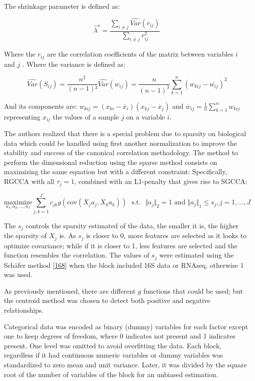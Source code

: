 \documentclass[
  12pt,
  a4paper,
  twoside,
  openright]{book}
\begin{document}
The shrinkage parameter is defined as:

\[
\widehat{\lambda}^{\star} = \dfrac{\sum_{i\neq j}\widehat{Var}(r_{ij})}{\sum_{i \neq j}r_{ij}^2}
\]

Where the \(r_{ij}\) are the correlation coefficients of the matrix between variables \(i\) and \(j\) .
Where the variance is defined as:

\[
\widehat{Var}(S_{ij}) = \dfrac{n^2}{{(n-1)}²} \widehat{Var}({w}_{ij}) = \dfrac{n}{{(n-1)}^3} \sum_{k=1}^n ( w_{kij} - \overline{w_{ij}})^2
\]

And its components are: \(w_{kij}=(x_{ki}-\overline{x}_i)(x_{kj}-\overline{x}_j)\) and \(\overline{w}_{ij}=\frac{1}{n}\sum_{k=1}^nw_{kij}\) representing \(x_{ij}\) the values of a sample \(j\) on a variable \(i\).

The authors realized that there is a special problem due to sparsity on biological data which could be handled using first another normalization to improve the stability and success of the canonical correlation methodology.
The method to perform the dimensional reduction using the sparse method consists on maximizing the same equation but with a different constraint: Specifically, RGCCA with all \(\tau_j = 1\), combined with an L1-penalty that gives rise to SGCCA:

\[
\underset{a_1,a_2, \dots,a_J}{\text{maximize}} \sum_{j, k = 1}^J c_{jk}g( \text{cov}(X_j a_j, X_k a_k)) \text{~~s.t.~~} \Vert a_j \Vert_2 = 1 \text{ and } \Vert a_j \Vert_1 \le s_j, j=1,\ldots,J
\]

The \(s_j\) controls the sparsity estimated of the data, the smaller it is, the higher the sparsity of \(X_j\) is.
As \(s_j\) is closer to 0, more features are selected as it looks to optimize covariance; while if it is closer to 1, less features are selected and the function resembles the correlation.
The values of \(s_j\) were estimated using the Schäfer method {[}\protect\hyperlink{ref-schuxe4fer2005}{168}{]} when the block included 16S data or RNAseq, otherwise 1 was used.

As previously mentioned, there are different \(g\) functions that could be used; but the centroid method was chosen to detect both positive and negative relationships.

Categorical data was encoded as binary (dummy) variables for each factor except one to keep degrees of freedom, where 0 indicates not present and 1 indicates present.
One level was omitted to avoid overfitting the data.
Each block, regardless if it had continuous numeric variables or dummy variables was standardized to zero mean and unit variance.
Later, it was divided by the square root of the number of variables of the block for an unbiased estimation.
\end{document}

